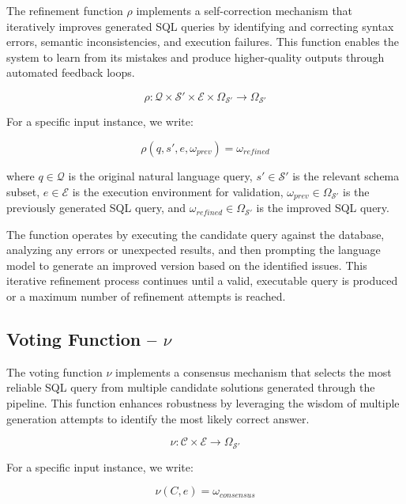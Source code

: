 The refinement function $\rho$ implements a self-correction mechanism that iteratively
improves generated SQL queries by identifying and correcting syntax errors,
semantic inconsistencies, and execution failures. This function enables the system
to learn from its mistakes and produce higher-quality outputs through automated
feedback loops.

$$
\rho: \mathcal{Q} \times \mathcal{S}' \times \mathcal{E} \times \Omega_{\mathcal{S}'} \rightarrow \Omega_{\mathcal{S}'}
$$

\vspace{0.5em}

For a specific input instance, we write:

$$
\rho(q, s', e, \omega_{prev}) = \omega_{refined}
$$

\vspace{0.5em}

where $q \in \mathcal{Q}$ is the original natural language query, $s' \in \mathcal{S}'$
is the relevant schema subset, $e \in \mathcal{E}$ is the execution environment for
validation, $\omega_{prev} \in \Omega_{\mathcal{S}'}$ is the previously generated SQL
query, and $\omega_{refined} \in \Omega_{\mathcal{S}'}$ is the improved SQL query.

The function operates by executing the candidate query against the database, analyzing
any errors or unexpected results, and then prompting the language model to generate
an improved version based on the identified issues. This iterative refinement
process continues until a valid, executable query is produced or a maximum number
of refinement attempts is reached.

\subsection{Voting Function – $\nu$}

The voting function $\nu$ implements a consensus mechanism that selects the most
reliable SQL query from multiple candidate solutions generated through the pipeline.
This function enhances robustness by leveraging the wisdom of multiple generation
attempts to identify the most likely correct answer.

$$
\nu: \mathcal{C} \times \mathcal{E} \rightarrow \Omega_{\mathcal{S}'}
$$

\vspace{0.5em}

For a specific input instance, we write:

$$
\nu(C, e) = \omega_{consensus}
$$


